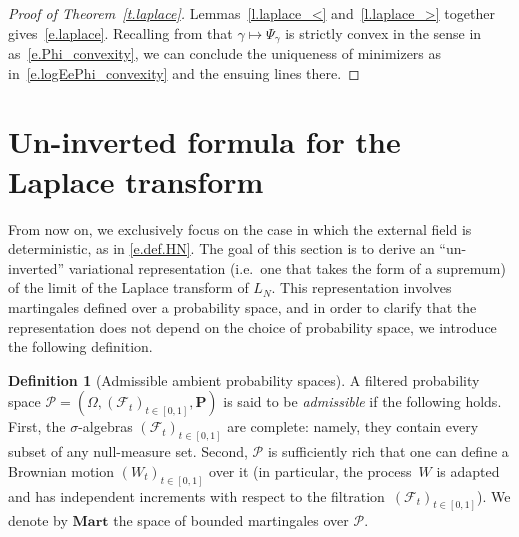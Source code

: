 \documentclass[11pt]{amsart}
\theoremstyle{remark}
\theoremstyle{definition}
\newtheorem{definition}[proposition]{Definition}
\numberwithin{equation}{section}
\numberwithin{proposition}{section}
\numberwithin{figure}{section}
\numberwithin{table}{section}
\newcommand{\PP}{\mathbf{P}}
\newcommand{\1}{\mathbf{1}}
\newcommand{\mcl}{\mathcal}
\newcommand{\msc}{\mathscr}
\newcommand{\bmart}{\mathbf{Mart}}
\begin{document}
\begin{proof}[Proof of Theorem~\ref{t.laplace}]
Lemmas~\ref{l.laplace_<} and~\ref{l.laplace_>} together gives~\eqref{e.laplace}.
Recalling from \cite[Lemma~5]{chen2018energy} that $\gamma\mapsto \Psi_\gamma$ is strictly convex in the sense in as~\eqref{e.Phi_convexity}, we can conclude the uniqueness of minimizers as in~\eqref{e.logEePhi_convexity} and the ensuing lines there.
\end{proof}




%
%
%
%
%
%
\section{Un-inverted formula for the Laplace transform}
\label{s.uninverting}


From now on, we exclusively focus on the case in which the external field is deterministic, as in \eqref{e.def.HN}. The goal of this section is to derive an ``un-inverted'' variational representation (i.e.\ one that takes the form of a supremum) of the limit of the Laplace transform of $L_N$. This representation involves martingales defined over a probability space, and in order to clarify that the representation does not depend on the choice of probability space, we introduce the following definition. 

\begin{definition}[Admissible ambient probability spaces]\label{d.admissible}
A filtered probability space $\mathscr P = (\Omega,(\mcl F_t)_{t \in [0,1]}, \PP)$ is said to be \emph{admissible} if the following holds. First, the $\sigma$-algebras $(\mcl F_t)_{t \in [0,1]}$ are  complete: namely, they contain every subset of any null-measure set. Second, $\msc P$ is sufficiently rich that one can define a Brownian motion $(W_t)_{t \in [0,1]}$ over it (in particular, the process~$W$ is adapted and has independent increments with respect to the filtration~$(\mcl F_t)_{t \in [0,1]}$). %
We denote by $\bmart$ the space of bounded martingales over $\msc P$.
\end{definition}

 
\end{document}
